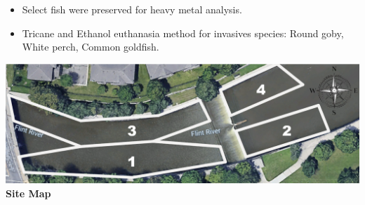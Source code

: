 \documentclass[b0paper,margin=1cm,landscape]{baposter}
\begin{document}
\begin{poster}
{\begin{itemize}
    \item Select fish were preserved for heavy metal analysis.
    \item Tricane and Ethanol euthanasia method for invasives species: Round goby, White perch, Common goldfish. 
  \end{itemize}
  \centering
    \includegraphics[width=\textwidth]{Img/Site_Map.png} \\
    \large
    \textbf{Site Map} \\
}
\end{poster}
\end{document}
